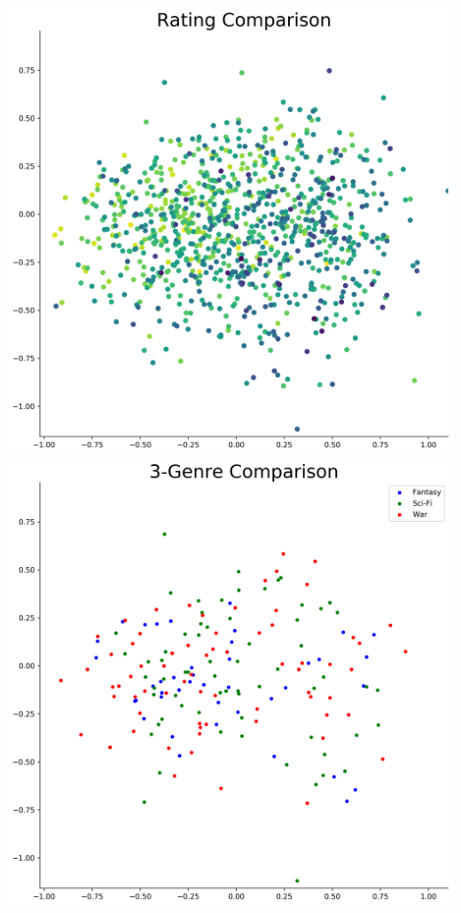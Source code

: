 \includegraphics[scale=0.35]{"Rating Comparison"}
\includegraphics[scale=0.35]{"3-Genre Comparison"} \\ \\
